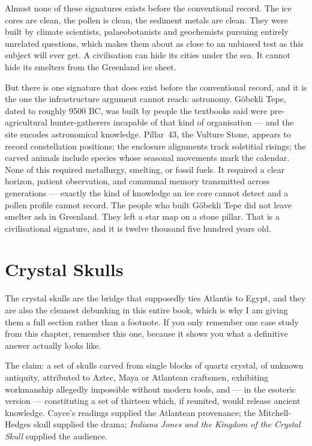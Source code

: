Almost none of these signatures exists before the conventional record. The ice cores are clean, the
pollen is clean, the sediment metals are clean.  They were built by climate scientists, palaeobotanists and
geochemists pursuing entirely unrelated questions, which makes them about as close to an unbiased
test as this subject will ever get. A civilisation can hide its cities under the sea. It cannot hide
its smelters from the Greenland ice sheet.

But there is one signature that does exist before the conventional record, and it is the one the
infrastructure argument cannot reach: astronomy. Göbekli Tepe, dated to roughly 9500 BC, was built
by people the textbooks said were pre-agricultural hunter-gatherers incapable of that kind of
organisation --- and the site encodes astronomical knowledge. Pillar~43, the Vulture Stone, appears
to record constellation positions; the enclosure alignments track solstitial risings; the carved
animals include species whose seasonal movements mark the calendar. None of this required
metallurgy, smelting, or fossil fuels. It required a clear horizon, patient observation, and
communal memory transmitted across generations --- exactly the kind of knowledge an ice core cannot
detect and a pollen profile cannot record. The people who built Göbekli Tepe did not leave smelter
ash in Greenland. They left a star map on a stone pillar. That is a civilisational signature, and it
is twelve thousand five hundred years old.


\section{Crystal Skulls}\label{sec:skulls}

The crystal skulls are the bridge that supposedly ties Atlantis to Egypt, and they are also the
cleanest debunking in this entire book, which is why I am giving them a full section rather than a
footnote. If you only remember one case study from this chapter, remember this one, because it shows
you what a definitive answer actually looks like.

The claim: a set of skulls carved from single blocks of quartz crystal, of unknown antiquity,
attributed to Aztec, Maya or Atlantean craftsmen, exhibiting workmanship allegedly impossible without
modern tools, and --- in the esoteric version --- constituting a set of thirteen which, if reunited,
would release ancient knowledge. Cayce's readings supplied the Atlantean provenance; the Mitchell-Hedges
skull supplied the drama; \emph{Indiana Jones and the Kingdom of the Crystal Skull} supplied the
audience.

